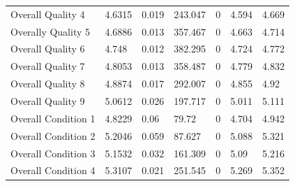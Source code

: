 \documentclass{article}
\begin{document}
\begin{table}[H]
\begin{tabular}{lllllll}
		Overall Quality 4                & 4.6315                    & 0.019                        & 243.047                & 0                                       & 4.594                         & 4.669                         \\
		Overally Quality 5               & 4.6886                    & 0.013                        & 357.467                & 0                                       & 4.663                         & 4.714                         \\
		Overall Quality 6                & 4.748                     & 0.012                        & 382.295                & 0                                       & 4.724                         & 4.772                         \\
		Overall Quality 7                & 4.8053                    & 0.013                        & 358.487                & 0                                       & 4.779                         & 4.832                         \\
		Overall Quality 8                & 4.8874                    & 0.017                        & 292.007                & 0                                       & 4.855                         & 4.92                          \\
		Overall Quality 9                & 5.0612                    & 0.026                        & 197.717                & 0                                       & 5.011                         & 5.111                         \\
		Overall Condition 1              & 4.8229                    & 0.06                         & 79.72                  & 0                                       & 4.704                         & 4.942                         \\
		Overall Condition 2              & 5.2046                    & 0.059                        & 87.627                 & 0                                       & 5.088                         & 5.321                         \\
		Overall Condition 3              & 5.1532                    & 0.032                        & 161.309                & 0                                       & 5.09                          & 5.216                         \\
		Overall Condition 4              & 5.3107                    & 0.021                        & 251.545                & 0                                       & 5.269                         & 5.352                         \\

\end{tabular}
\end{table}
\end{document}
